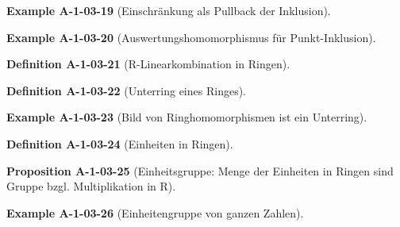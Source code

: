 \documentclass[10pt, letterpaper]{article}
\newcommand{\CustomHeading}[3]{%
  \par\medskip\noindent%
  \textbf{#1 #2} \textnormal{(#3)}.\enskip%
}
\newenvironment{DEF}[2]{\CustomHeading{Definition}{#1}{#2}}{}
\newenvironment{PROP}[2]{\CustomHeading{Proposition}{#1}{#2}}{}
\newenvironment{EXA}[2]{\CustomHeading{Example}{#1}{#2}}{}
\begin{document}
\begin{EXA}{A-1-03-19}{Einschränkung als Pullback der Inklusion}
\end{EXA}


\begin{EXA}{A-1-03-20}{Auswertungshomomorphismus für Punkt-Inklusion}
\end{EXA}


\begin{DEF}{A-1-03-21}{R-Linearkombination in Ringen}
\end{DEF}


\begin{DEF}{A-1-03-22}{Unterring eines Ringes}
\end{DEF}


\begin{EXA}{A-1-03-23}{Bild von Ringhomomorphismen ist ein Unterring}
\end{EXA}


\begin{DEF}{A-1-03-24}{Einheiten in Ringen}
\end{DEF}


\begin{PROP}{A-1-03-25}{Einheitsgruppe: Menge der Einheiten in Ringen sind Gruppe bzgl. Multiplikation in R}
\end{PROP}


\begin{EXA}{A-1-03-26}{Einheitengruppe von ganzen Zahlen}
\end{EXA}
\end{document}
